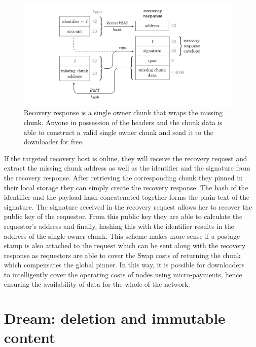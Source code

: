 \begin{figure}[htbp]
\centering
\includegraphics[width=\textwidth]{fig/recovery-response-2.pdf}
\caption[Recovery response \statusgreen]{Recovery response is a single owner chunk that wraps the missing chunk. Anyone in possession of the headers and the chunk data is able to construct a valid single owner chunk and send it to the downloader for free.}
\label{fig:recovery-response}
\end{figure}

If the targeted recovery host is online, they will receive the recovery request and extract the missing chunk address as well as the identifier and the signature from the recovery response. After retrieving the corresponding chunk they pinned in their local storage they can simply create the recovery response. The hash of the identifier and the payload hash concatenated together forms the plain text of the signature. The signature received in the recovery request allows her to recover the public key of the requestor. From this public key they are able to calculate the requestor's address and finally, hashing this with the identifier results in the address of the single owner chunk. This scheme makes more sense if a postage stamp is also attached to the request which can be sent along with the recovery response as requestors are able to cover the Swap costs of returning the chunk which compensates the global pinner. In this way, it is possible for downloaders to intelligently cover the operating costs of nodes using micro-payments, hence ensuring the availability of data for the whole of the network.

\section{Dream: deletion and immutable content}\label{sec:dream}





